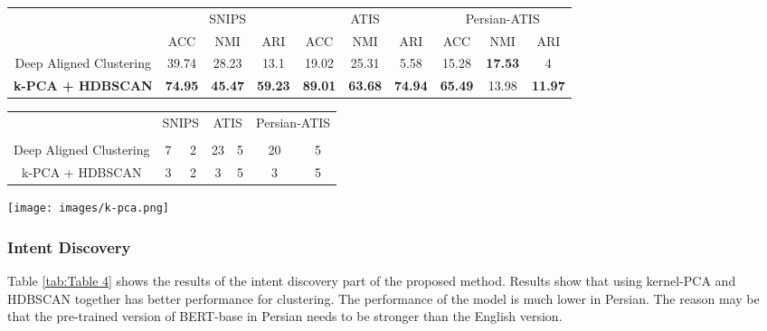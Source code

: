 \documentclass{article}
\begin{document}
\begin{table*}
	\centering
	\caption{Results of evaluating the proposed method for Intent Discovery (clustering)}
	\label{tab:Table 4}
	\begin{tabular}{cccccccccc}
	  \toprule
	  & \multicolumn{3}{c}{SNIPS} & \multicolumn{3}{c}{ATIS} & \multicolumn{3}{c}{Persian-ATIS} \\
	  & ACC & NMI & ARI & ACC & NMI & ARI & ACC & NMI & ARI \\ \hline
	  \midrule
	  Deep Aligned Clustering & 39.74 & 28.23 & 13.1 & 19.02 & 25.31 & 5.58 & 15.28 & \textbf{17.53} & 4 \\ \hline
	  \textbf{k-PCA + HDBSCAN} & \textbf{74.95} & \textbf{45.47} & \textbf{59.23} & \textbf{89.01} & \textbf{63.68} & \textbf{74.94} & \textbf{65.49} & 13.98 & \textbf{11.97}\\ \hline
\end{tabular}
  \end{table*}
  \begin{table*}
	\centering
	\caption{The ability of methods to find different available intents in OOD utterances}
	\label{tab:Table 5}
	\begin{tabular}{ccccccc}
	  \toprule
	  & \multicolumn{2}{c}{SNIPS} & \multicolumn{2}{c}{ATIS} & \multicolumn{2}{c}{Persian-ATIS} \\
	  &  &  &  &  &  &  \\ \hline
	  \midrule
	  Deep Aligned Clustering & 7 & 2 & 23 & 5 & 20 & 5 \\ \hline
	  k-PCA + HDBSCAN & 3 & 2 & 3 & 5 & 3 & 5 \\ \hline
\end{tabular}
  \end{table*}
  \begin{figure*}[ht!]
	\centering
	\texttt{[image: images/k-pca.png]}
	\caption{Quality of representations of OOD utterances after applying kernel-PCA}
	\label{fig:Figure 4}
  \end{figure*}

\subsubsection{Intent Discovery}

Table \ref{tab:Table 4} shows the results of the intent discovery part of the proposed method. 
Results show that using kernel-PCA and HDBSCAN together has better performance for clustering. 
The performance of the model is much lower in Persian. The reason may be that the pre-trained version of BERT-base in Persian needs to be stronger than the English version.
\end{document}
